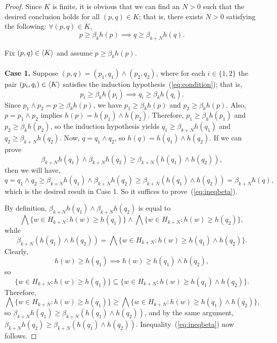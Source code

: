 \begin{proof}
Since $K$ is finite, it is obvious that we can find an $N>0$ such that 
the desired conclusion holds for all $(p, q) \in K$; that is, there exists 
$N>0$ satisfying the following: $\forall (p,q) \in K$,
\begin{equation}
  \label{eq:condition}
  p\geq \beta_k h(p) \implies q \geq \beta_{k+N} h(q).
\end{equation}

\noindent Fix $(p,q) \in \langle K\rangle$ and assume $p \geq \beta_k h(p)$.\\
\\
{\bf Case 1.} Suppose
$(p,q) = (p_1, q_1) \wedge (p_2, q_2)$,
where for each $i\in \{1,2\}$ the pair $(p_i, q_i) \in \langle K\rangle$ satisfies the induction 
hypothesis~(\ref{eq:condition}); that is,
\[
p_i \geq \beta_kh(p_i) \implies q_i \geq \beta_kh(q_i).
\]
Since $p_1  \wedge p_2 = p \geq \beta_k h(p)$, we have $p_1 \geq \beta_k h(p)$ and
$p_2 \geq \beta_k h(p)$.
Also, $p = p_1 \wedge p_2$ implies $h(p) = h(p_1) \wedge h(p_2)$.
Therefore, $p_1 \geq \beta_k h(p_1)$ and
$p_2 \geq \beta_k h(p_2)$, so the induction hypothesis yields
$q_1 \geq \beta_{k+N}h(q_1)$ and $q_2 \geq \beta_{k+N}h(q_2)$.
Now, $q = q_1 \wedge q_2$, so 
$h(q) = h(q_1) \wedge h(q_2)$.
If we can prove
\begin{equation}  \label{eq:ineqbeta}
\beta_{k+N}h(q_1) \wedge \beta_{k+N}h(q_2) \geq \beta_{k+N}(h(q_1) \wedge h(q_2)),
\end{equation}
then we will have,
\[
q = q_1 \wedge q_2 \geq \beta_{k+N}h(q_1) \wedge \beta_{k+N}h(q_2)
\geq \beta_{k+N}(h(q_1) \wedge h(q_2)) = \beta_{k+N}h(q),
\]
which is the desired result in Case 1. So it suffices to prove~(\ref{eq:ineqbeta}).

By definition, 
$\beta_{k+N}h(q_1) \wedge \beta_{k+N}h(q_2)$ is equal to 
\[
\bigwedge \{w \in H_{k+N} : h(w) \geqslant h(q_1)\}
\wedge \bigwedge \{w \in H_{k+N} : h(w) \geqslant h(q_2)\},
\]
while
\[
\beta_{k+N}(h(q_1) \wedge h(q_2))  = 
\bigwedge \{w \in H_{k+N} : h(w) \geqslant h(q_1) \wedge h(q_2)\}.
\]
Clearly, 
\[
h(w) \geqslant h(q_1) \implies h(w) \geqslant h(q_1) \wedge h(q_2),
\]
so
\[
\{w \in H_{k+N} : h(w) \geqslant h(q_1)\}\subseteq 
\{w \in H_{k+N} : h(w) \geqslant h(q_1) \wedge h(q_2)\}.
\]
Therefore,
\[
\bigwedge \{w \in H_{k+N} : h(w) \geqslant h(q_1)\}
\geq \bigwedge \{w \in H_{k+N} : h(w) \geqslant h(q_1) \wedge h(q_2)\},\]
so $\beta_{k+N}h(q_1)  \geq \beta_{k+N}(h(q_1) \wedge h(q_2))$, and 
by the same argument,
$\beta_{k+N}h(q_2)  \geq \beta_{k+N}(h(q_1) \wedge h(q_2))$.
Inequality~(\ref{eq:ineqbeta}) now follows.


\end{proof}
